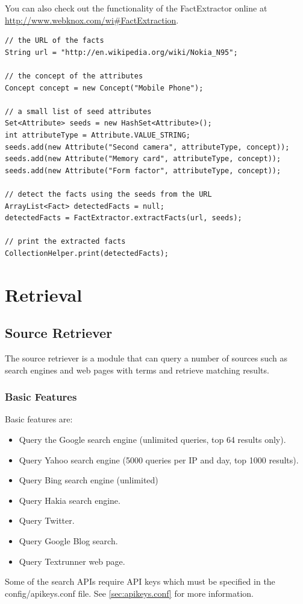\documentclass[a4paper,twoside]{book}      %
\begin{document}
You can also check out the functionality of the FactExtractor online at \url{http://www.webknox.com/wi#FactExtraction}.

\begin{codelisting}
\label{listing:factExtraction}
\begin{lstlisting}[frame=tb]
// the URL of the facts
String url = "http://en.wikipedia.org/wiki/Nokia_N95";

// the concept of the attributes
Concept concept = new Concept("Mobile Phone");

// a small list of seed attributes
Set<Attribute> seeds = new HashSet<Attribute>();
int attributeType = Attribute.VALUE_STRING;
seeds.add(new Attribute("Second camera", attributeType, concept));
seeds.add(new Attribute("Memory card", attributeType, concept));
seeds.add(new Attribute("Form factor", attributeType, concept));

// detect the facts using the seeds from the URL
ArrayList<Fact> detectedFacts = null;
detectedFacts = FactExtractor.extractFacts(url, seeds);
		
// print the extracted facts
CollectionHelper.print(detectedFacts);
\end{lstlisting}
\end{codelisting}

\section{Retrieval}

\subsection{Source Retriever}
The source retriever is a module that can query a number of sources such as search engines and web pages with terms and retrieve matching results.
\subsubsection{Basic Features}
Basic features are:
\begin{itemize}
\item Query the Google search engine (unlimited queries, top 64 results only).
\item Query Yahoo search engine (5000 queries per IP and day, top 1000 results).
\item Query Bing search engine (unlimited)
\item Query Hakia search engine.
\item Query Twitter.
\item Query Google Blog search.
\item Query Textrunner web page.
\end{itemize}
Some of the search APIs require API keys which must be specified in the config/apikeys.conf file. See \ref{sec:apikeys.conf} for more information.
\end{document}
